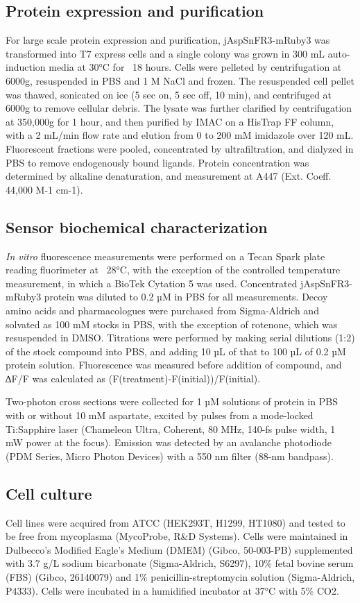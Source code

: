 \documentclass[9pt,lineno]{elife}
\begin{document}
\subsection{Protein expression and purification}
For large scale protein expression and purification, jAspSnFR3-mRuby3 was transformed into T7 express cells and a single colony was grown in 300 mL auto-induction media \citep{Studier2005-ki} at 30°C for ~18 hours.
Cells were pelleted by centrifugation at 6000g, resuspended in PBS and 1 M NaCl and frozen.
The resuspended cell pellet was thawed, sonicated on ice (5 sec on, 5 sec off, 10 min), and centrifuged at 6000g to remove cellular debris.
The lysate was further clarified by centrifugation at 350,000g for 1 hour, and then purified by IMAC on a HisTrap FF column, with a 2 mL/min flow rate and elution from 0 to 200 mM imidazole over 120 mL.
Fluorescent fractions were pooled, concentrated by ultrafiltration, and dialyzed in PBS to remove endogenously bound ligands.
Protein concentration was determined by alkaline denaturation, and measurement at A447 (Ext. Coeff. 44,000 M-1 cm-1).

\subsection{Sensor biochemical characterization}
\textit{In vitro} fluorescence measurements were performed on a Tecan Spark plate reading fluorimeter at ~28°C, with the exception of the controlled temperature measurement, in which a BioTek Cytation 5 was used.
Concentrated jAspSnFR3-mRuby3 protein was diluted to 0.2 µM in PBS for all measurements.
Decoy amino acids and pharmacologues were purchased from Sigma-Aldrich and solvated as 100 mM stocks in PBS, with the exception of rotenone, which was resuspended in DMSO.
Titrations were performed by making serial dilutions (1:2) of the stock compound into PBS, and adding 10 µL of that to 100 µL of 0.2 µM protein solution.
Fluorescence was measured before addition of compound, and ∆F/F was calculated as (F(treatment)-F(initial))/F(initial).

Two-photon cross sections were collected for 1 µM solutions of protein in PBS with or without 10 mM aspartate, excited by pulses from a mode-locked Ti:Sapphire laser (Chameleon Ultra, Coherent, 80 MHz, 140-fs pulse width, 1 mW power at the focus).
Emission was detected by an avalanche photodiode (PDM Series, Micro Photon Devices) with a 550 nm filter (88-nm bandpass).

\subsection{Cell culture}
Cell lines were acquired from ATCC (HEK293T, H1299, HT1080) and tested to be free from mycoplasma (MycoProbe, R\&D Systems).
Cells were maintained in Dulbecco’s Modified Eagle’s Medium (DMEM) (Gibco, 50-003-PB) supplemented with 3.7 g/L sodium bicarbonate (Sigma-Aldrich, S6297), 10\% fetal bovine serum (FBS) (Gibco, 26140079) and 1\% penicillin-streptomycin solution (Sigma-Aldrich, P4333).
Cells were incubated in a humidified incubator at 37°C with 5\% CO2.
\end{document}
